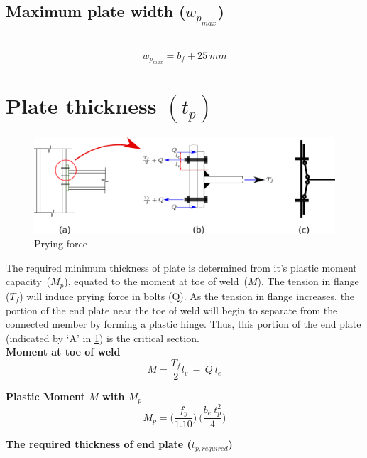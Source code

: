\documentclass[11.5pt,a4paper,oneside]{report}
\begin{document}
\begin{Form}
\subsection{Maximum plate width (\boldmath $w_{p_{max}}$)}
\qquad {} \\
	\begin{equation}
		w_{p_{max}} = b_f + 25~mm
	\end{equation}
			


\section{Plate thickness $(t_{p})$}
\begin{figure}[h]
	\centering
	\includegraphics[width=0.8\linewidth]{prying.png}
	\caption{Prying force}
	\label{fig:prying}
\end{figure}


The required minimum thickness of plate is determined from it's plastic moment capacity~($M_p$), equated to the moment at toe of weld~($M$). The tension in flange ($T_f$) will induce prying force in bolts (Q). As the tension in flange increases, the portion of the end plate near the toe of weld will begin to separate from the connected member by forming a plastic hinge. Thus, this portion of the end plate (indicated by `A' in \ref{fig:prying}) is the critical section.\\


\textbf{Moment at toe of weld} \\
	\begin{equation}
		M = \frac{T_f}{2}  l_v ~ - ~ Q ~ l_e
	\end{equation}

\textbf{Plastic Moment $M$ with $M_p$} \\
	\begin{equation}
		M_p = \bigg(\frac{f_y}{1.10}\bigg) ~ \bigg(\frac{b_e~t_{p}^{2}}{4}\bigg)
	\end{equation}
	
\textbf{The required thickness of end plate ($t_{p,required}$)} \\


\end{Form}
\end{document}
